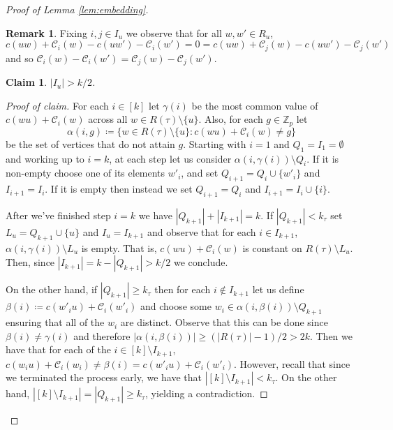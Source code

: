 \documentclass{article}
\newcommand{\cC}{\mathcal{C} }
\newtheorem{claim}[theorem]{Claim}
\theoremstyle{definition}
\newtheorem{remark}[theorem]{Remark}
\newenvironment{subproof}[1][\proofname]{%
  \renewcommand{\qedsymbol}{$\blacksquare$}%
  \begin{proof}[#1]%
}{%
  \end{proof}%
}
\begin{document}
\begin{proof}[Proof of Lemma \ref{lem:embedding}]
\begin{remark}\label{rem:C-C}
    Fixing $i,j\in I_u$ we observe that for all $w,w'\in R_u$, $$c(uw)+\cC_i(w)-c(uw')-\cC_i(w')=0=c(uw)+\cC_j(w)-c(uw')-\cC_j(w')$$ and so $\cC_i(w)-\cC_i(w')=\cC_j(w)-\cC_j(w')$.
\end{remark}


\begin{claim}
    $|I_u|> k/2$.
\end{claim}

\begin{subproof}[Proof of claim]
For each $i\in [k]$ let $\gamma(i)$ be the most common value of $c(wu)+\cC_{i}(w)$ across all $w\in R(\tau)\setminus\{u\}$. Also, for each $g\in \mathbb{Z}_p$ let $$\alpha(i,g)\coloneqq\{w\in R(\tau)\setminus\{u\}: c(wu)+\cC_{i}(w)\neq g \}$$ be the set of vertices that do not attain $g$. Starting with $i=1$ and $Q_1=I_1=\emptyset$ and working up to $i=k$, at each step let us consider $\alpha(i,\gamma(i))\setminus Q_i$. If it is non-empty choose one of its elements $w'_{i}$, and set $Q_{i+1}=Q_i \cup \{w'_i\}$ and $I_{i+1}=I_i$. If it is empty then instead we set $Q_{i+1}=Q_i$ and $I_{i+1}=I_i\cup \{i\}$. 

After we've finished step $i=k$ we have $|Q_{k+1}|+|I_{k+1}| = k$. If $|Q_{k+1}|< k_\tau$ set $L_u=Q_{k+1}\cup \{u\}$ and $I_u=I_{k+1}$ and observe that for each $i\in I_{k+1}$, $\alpha(i,\gamma(i))\setminus L_u$ is empty. That is, $c(wu)+\cC_{i}(w)$ is constant on $R(\tau)\setminus L_u$. Then, since $|I_{k+1}|=k-|Q_{k+1}| > k/2$ we conclude.

On the other hand, if $|Q_{k+1}| \geq  k_\tau$ then for each $i\notin I_{k+1}$ let us define $\beta(i)\coloneqq c(w'_iu)+\cC_{i}(w'_i)$ and choose some $w_i\in \alpha(i,\beta(i))\setminus Q_{k+1}$ ensuring that all of the $w_i$ are distinct. Observe that this can be done since $\beta(i)\neq \gamma(i)$ and therefore $|\alpha(i,\beta(i))|\geq (|R(\tau)|-1)/2 > 2 k$. Then we have that for each of the  $i\in [k]\setminus I_{k+1}$, $c(w_iu)+\cC_{i}(w_i)\neq \beta(i)= c(w'_iu)+\cC_{i}(w'_i)$. However, recall that since we terminated the process early, we have that $|[k]\setminus I_{k+1}|<k_\tau$. On the other hand, $|[k]\setminus I_{k+1}|=|Q_{k+1}|\geq k_\tau$, yielding a contradiction. 
\end{subproof}




\end{proof}
\end{document}
